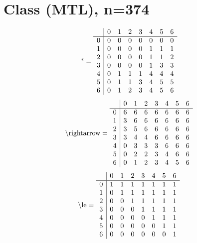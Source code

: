 \documentclass[11pt]{article}
\begin{document}
\section{Class (MTL), n=374}
\[\text{*} = 
\begin{array}{r | r r r r r r r}
 & 0 & 1 & 2 & 3 & 4 & 5 & 6 \\ \hline
0 & 0 & 0 & 0 & 0 & 0 & 0 & 0 \\
1 & 0 & 0 & 0 & 0 & 1 & 1 & 1 \\
2 & 0 & 0 & 0 & 0 & 1 & 1 & 2 \\
3 & 0 & 0 & 0 & 0 & 1 & 3 & 3 \\
4 & 0 & 1 & 1 & 1 & 4 & 4 & 4 \\
5 & 0 & 1 & 1 & 3 & 4 & 5 & 5 \\
6 & 0 & 1 & 2 & 3 & 4 & 5 & 6 \\
\end{array}
\]
\[\text{\textbackslash rightarrow} = 
\begin{array}{r | r r r r r r r}
 & 0 & 1 & 2 & 3 & 4 & 5 & 6 \\ \hline
0 & 6 & 6 & 6 & 6 & 6 & 6 & 6 \\
1 & 3 & 6 & 6 & 6 & 6 & 6 & 6 \\
2 & 3 & 5 & 6 & 6 & 6 & 6 & 6 \\
3 & 3 & 4 & 4 & 6 & 6 & 6 & 6 \\
4 & 0 & 3 & 3 & 3 & 6 & 6 & 6 \\
5 & 0 & 2 & 2 & 3 & 4 & 6 & 6 \\
6 & 0 & 1 & 2 & 3 & 4 & 5 & 6 \\
\end{array}
\]
\[\text{\textbackslash le} = 
\begin{array}{r | r r r r r r r}
 & 0 & 1 & 2 & 3 & 4 & 5 & 6 \\ \hline
0 & 1 & 1 & 1 & 1 & 1 & 1 & 1 \\
1 & 0 & 1 & 1 & 1 & 1 & 1 & 1 \\
2 & 0 & 0 & 1 & 1 & 1 & 1 & 1 \\
3 & 0 & 0 & 0 & 1 & 1 & 1 & 1 \\
4 & 0 & 0 & 0 & 0 & 1 & 1 & 1 \\
5 & 0 & 0 & 0 & 0 & 0 & 1 & 1 \\
6 & 0 & 0 & 0 & 0 & 0 & 0 & 1 \\
\end{array}
\]
\end{document}
